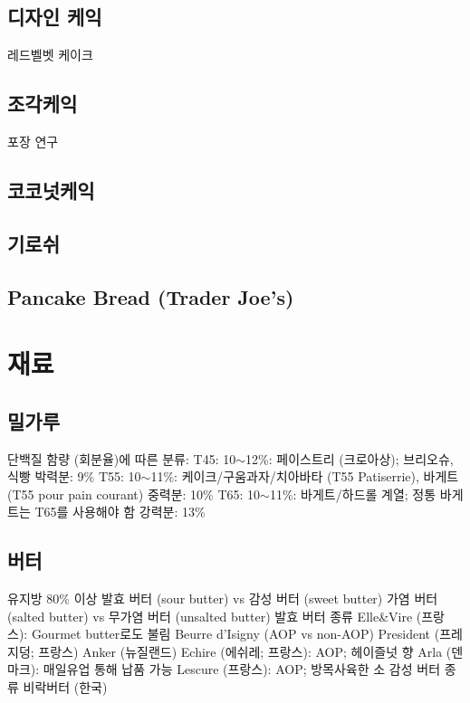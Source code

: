 \documentclass{myproc}
\begin{document}
\subsection{\textcolor{blue2}{디자인 케익}}
\bit
\w 레드벨벳 케이크
\eit

\subsection{\textcolor{blue2}{조각케익}}
\bit
\w 포장 연구
\eit

\subsection{\textcolor{blue2}{코코넛케익}}
\subsection{\textcolor{blue2}{기로쉬}}
\subsection{\textcolor{green2}{Pancake Bread (Trader Joe's)}}

\section{\textcolor{red2}{재료}}
\subsection{\textcolor{blue2}{밀가루}}
\bit
\w 단백질 함량 (회분율)에 따른 분류:
  \bit
  \w T45: 10$\sim$12\%: 페이스트리 (크로아상); 브리오슈, 식빵
  \w 박력분: 9\%
  \w T55: 10$\sim$11\%: 케이크/구움과자/치아바타 (T55 Patiserrie), 바게트 (T55
  pour pain courant)
  \w 중력분: 10\%
  \w T65: 10$\sim$11\%: 바게트/하드롤 계열; 정통 바게트는 T65를 사용해야 함
  \w 강력분: 13\%
  \eit
\eit
\subsection{\textcolor{blue2}{버터}}
\bit
\w 유지방 80\% 이상
\w 발효 버터 (sour butter) vs  감성 버터 (sweet butter)
\w 가염 버터 (salted butter) vs 무가염 버터 (unsalted butter)
\w 발효 버터 종류
  \bit
  \w Elle\&Vire (프랑스): Gourmet butter로도 불림
  \w Beurre d'Isigny (AOP vs non-AOP)
  \w President (프레지덩; 프랑스)
  \w Anker (뉴질랜드)
  \w Echire (에쉬레; 프랑스): AOP; 헤이즐넛 향
  \w Arla (덴마크): 매일유업 통해 납품 가능
  \w Lescure (프랑스): AOP; 방목사육한 소
  \eit
\w 감성 버터 종류
  \bit   
  \w 비락버터 (한국)
  \eit
\eit
\end{document}
